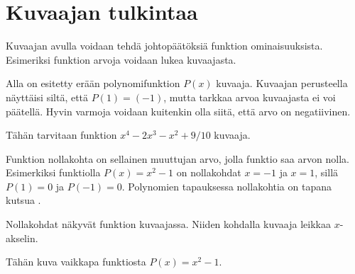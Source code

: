 \section*{Kuvaajan tulkintaa}


Kuvaajan avulla voidaan tehdä johtopäätöksiä funktion ominaisuuksista.
Esimeriksi funktion arvoja voidaan lukea kuvaajasta.

\begin{esimerkki}
Alla on esitetty erään polynomifunktion $P(x)$ kuvaaja. Kuvaajan perusteella näyttäisi siltä, että $P(1)=(-1)$,
mutta tarkkaa arvoa kuvaajasta ei voi päätellä. Hyvin varmoja voidaan kuitenkin olla siitä, että arvo on negatiivinen.

Tähän tarvitaan funktion $x^4-2x^3-x^2+9/10$ kuvaaja.
\end{esimerkki}

Funktion nollakohta on sellainen muuttujan arvo, jolla funktio saa arvon nolla. Esimerkiksi funktiolla $P(x)=x^2-1$
on nollakohdat $x=-1$ ja $x=1$, sillä $P(1)=0$ ja $P(-1)=0$. Polynomien tapauksessa nollakohtia on tapana kutsua
.

Nollakohdat näkyvät funktion kuvaajassa. Niiden kohdalla kuvaaja leikkaa $x$-akselin.

\begin{esimerkki}
Tähän kuva vaikkapa funktiosta $P(x)=x^2-1$.
\end{esimerkki}


